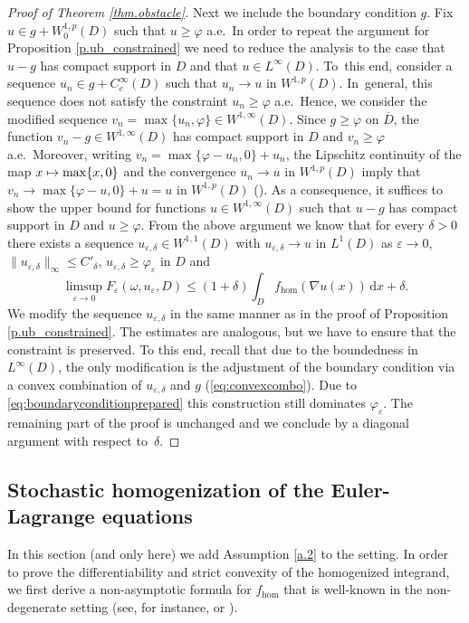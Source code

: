 \documentclass[JEP,XML,SOM,Unicode,published]{cedram}
\def\mto{\mathchoice{\longmapsto}{\mapsto}{\mapsto}{\mapsto}}
\theoremstyle{definition}
\let\e\varepsilon
\let\w\omega
\newcommand{\dx}{\,\mathrm{d}x}
\begin{document}
\begin{proof}[Proof of Theorem \ref{thm.obstacle}]
Next we include the boundary condition $g$. Fix $u\in g+W^{1,p}_0(D)$ such that $ u\geq\varphi$ a.e.\ In order to repeat the argument for Proposition \ref{p.ub_constrained} we need to reduce the analysis to the case that $u-g$ has compact support in $D$ and that $u\in L^{\infty}(D)$. To~this end, consider a sequence $u_n\in g+C_c^{\infty}(D)$ such that $u_n\to u$ in $W^{1,p}(D)$. In~general, this sequence does not satisfy the constraint $u_n\geq\varphi$ a.e.\ Hence, we consider the modified sequence $v_n=\max\{u_n,\varphi\}\in W^{1,\infty}(D)$. Since $g\geq\varphi$ on $\overline{D}$, the function $v_n-g\in W^{1,\infty}(D)$ has compact support in $D$ and $v_n\geq\varphi$ a.e.\ Moreover, writing $v_n=\max\{\varphi-u_n,0\}+u_n$, the Lipschitz continuity of the map $x\mto \max\{x,0\}$ and the convergence $u_n\to u$ in $W^{1,p}(D)$ imply that $v_n\to \max\{\varphi-u,0\}+u=u$ in $W^{1,p}(D)$ (\cf \cite[Th.\,1]{MM}). As a consequence, it suffices to show the upper bound for functions $u\in W^{1,\infty}(D)$ such that $u-g$ has compact support in $D$ and $u\geq\varphi$. From the above argument we know that for every $\delta>0$ there exists a sequence $u_{\e,\delta}\in W^{1,1}(D)$ with $u_{\e,\delta}\to u$ in $L^1(D)$ as $\e\to 0$, $\|u_{\e,\delta}\|_{\infty}\leq C'_\delta$, $u_{\e,\delta}\geq \varphi_{\e}$ in $D$ and
\begin{equation*}
\limsup_{\e\to 0}F_{\e}(\w,u_{\e},D)\leq(1+\delta)\int_D f_{\hom}(\nabla u(x))\dx+\delta.
\end{equation*}
We modify the sequence $u_{\e,\delta}$ in the same manner as in the proof of Proposition \ref{p.ub_constrained}. The estimates are analogous, but we have to ensure that the constraint is preserved. To this end, recall that due to the boundedness in $L^{\infty}(D)$, the only modification is the adjustment of the boundary condition via a convex combination of $u_{\e,\delta}$ and $g$ (\cf \eqref{eq:convexcombo}). Due to \eqref{eq:boundaryconditionprepared} this construction still dominates $\varphi_{\e}$. The remaining part of the proof is unchanged and we conclude by a diagonal argument with respect to~$\delta$.
\end{proof}

\subsection{Stochastic homogenization of the Euler-Lagrange equations}
In this section (and only here) we add Assumption \ref{a.2} to the setting. In order to prove the differentiability and strict convexity of the homogenized integrand, we first derive a non-asymptotic formula for $f_{\hom}$ that is well-known in the non-degenerate setting (see, for instance, \cite[Chap.\,15]{JKO} or \cite[Lem.\,3.7]{DG_unbounded}).
\end{document}
